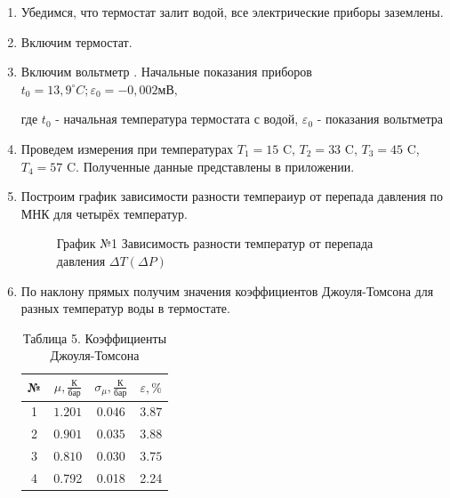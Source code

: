\documentclass[a4paper,12pt]{article}
\begin{document}
\begin{enumerate}
        \item Убедимся, что термостат залит водой, все электрические приборы
        заземлены.
        \item Включим термостат.
        \item Включим вольтметр . Начальные показания приборов $t_0 = 13,9 ^\circ C; \varepsilon_0 = -0,002 \text{мВ},$

где $t_0$ - начальная температура термостата с водой, $\varepsilon_0$ - показания вольтметра

        \item Проведем измерения при температурах $T_1 = 15$ \textdegree C,
        $T_2 = 33$ \textdegree C, $T_3 = 45$ \textdegree C, $T_4 = 57$ \textdegree C. Полученные данные представлены в приложении.

        \item Построим график зависимости разности темпераиур от перепада давления по МНК для четырёх температур.

        \begin{figure}[h!]
        \caption[]{\label{} График №1 Зависимость разности температур от перепада давления $\Delta T(\Delta P)$}
        \end{figure}

        \item По наклону прямых получим значения коэффициентов Джоуля-Томсона для разных температур воды в термостате. 
\begin{table}[h!]
    \centering
    \begin{tabular}{|c|c|c|c|}
        \hline
        № & $\mu, \frac{\text{К}}{\text{бар}}$ & $\sigma_{\mu}, \frac{\text{К}}{\text{бар}}$ & $\varepsilon, \%$ \\
        \hline
        1 & $1.201$ & $0.046$ & $3.87$ \\
        \hline
        2 & $0.901$ & $0.035$ & $3.88$ \\
        \hline
        3 & $0.810$ & $0.030$ & $3.75$ \\
        \hline
	  4 & 0.792	&0.018&	2.24 \\
	  \hline
    \end{tabular}
    \caption{Таблица 5. Коэффициенты Джоуля-Томсона}
\end{table}


\end{enumerate}
\end{document}

